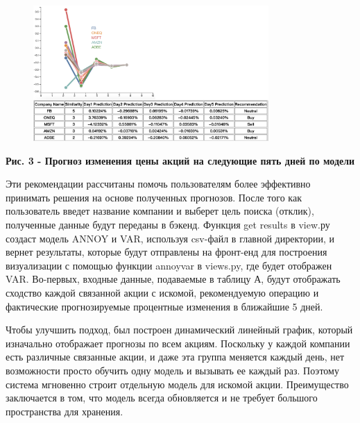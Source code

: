 {\begin{figure}[H]
	\centering
	\includegraphics[width=0.8\textwidth]{media/ict2/image5}
	\caption*{}
\end{figure}


{\bfseries Рис. 3 - Прогноз изменения цены акций на следующие пять дней по
модели}

Эти рекомендации рассчитаны помочь пользователям более эффективно
принимать решения на основе полученных прогнозов. После того как
пользователь введет название компании и выберет цель поиска (отклик),
полученные данные будут переданы в бэкенд. Функция get results в view.ру
создаст модель ANNOY и VAR, используя csv-файл в главной директории, и
вернет результаты, которые будут отправлены на фронт-енд для построения
визуализации с помощью функции annoyvar в views.py, где будет отображен
VAR. Во-первых, входные данные, подаваемые в таблицу А, будут отображать
сходство каждой связанной акции с искомой, рекомендуемую операцию и
фактические прогнозируемые процентные изменения в ближайшие 5 дней.

Чтобы улучшить подход, был построен динамический линейный график,
который изначально отображает прогнозы по всем акциям. Поскольку у
каждой компании есть различные связанные акции, и даже эта группа
меняется каждый день, нет возможности просто обучить одну модель и
вызывать ее каждый раз. Поэтому система мгновенно строит отдельную
модель для искомой акции. Преимущество заключается в том, что модель
всегда обновляется и не требует большого пространства для хранения.

}
